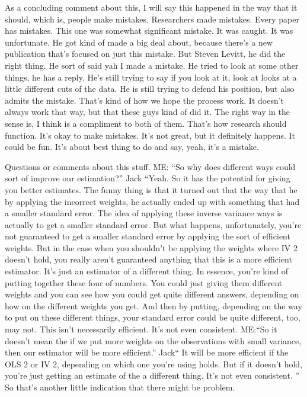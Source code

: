 \documentclass[11pt,a4paper]{amsart}
\theoremstyle{plain}
\theoremstyle{definition}
\begin{document}
				 As a concluding comment about this, I will say this happened in the way that it should, which is, people make mistakes. Researchers made mistakes. Every paper has mistakes. This one was somewhat significant mistake. It was caught. It was unfortunate. He got kind of made a big deal about, because there's a new publication that's focused on just this mistake. But Steven Levitt, he did the right thing.  He sort of said yah I made a mistake. He tried to look at some other things, he has a reply. He's still trying to say if you look at it, look at looks at a little different cuts of the data.  He is still trying to defend his position, but also admits the mistake. That's kind of how we hope the process work.  It doesn't always work that way, but that these guys kind of did it. The right way in the sense is, I think is a compliment to both of them.  That's how research should function. It's okay to make mistakes. It's not great, but it definitely happens. It could be fun. It's about best thing to do and say, yeah, it's a mistake. \par
				 Questions or comments about this stuff. ME: ``So why does different ways could sort of improve our estimation?'' Jack ``Yeah. So it has the potential for giving you better estimates. The funny thing is that it turned out that the way that he by applying the incorrect weights, he actually ended up with something that had a smaller standard error. The idea of applying these inverse variance ways is actually to get a smaller standard error. But what happens, unfortunately, you're not guaranteed to get a smaller standard error by applying the sort of efficient weights.  But in the case when you shouldn't be applying the weights where IV 2 doesn't hold, you really aren't guaranteed anything that this is a more efficient estimator. It's just an estimator of a different thing. In essence, you're kind of putting together these four of numbers. You could just giving them different weights and you can see how you could get quite different answers, depending on how on the different weights you get. And then by putting, depending on the way to put on these different things, your standard error could be quite different, too, may not. This isn't necessarily efficient. It's not even consistent. ME:``So it doesn't mean the if we put more weights on the observations with small variance, then our estimator will be more efficient.'' Jack`` It will be more efficient if the OLS 2 or IV 2, depending on which one you're using holds. But if it doesn't hold, you're just getting an estimate of the a different thing. It's not even consistent. '' So that's another little indication that there might be problem. \par 
\end{document}

